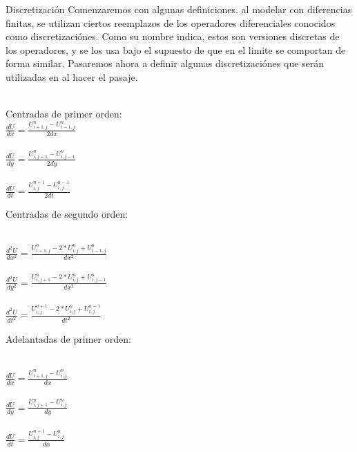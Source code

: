 
\begin{section}{Discretización}
Comenzaremos con algunas definiciones. al modelar con diferencias finitas, se utilizan ciertos reemplazos de los operadores diferenciales conocidos como discretizaciónes. Como su nombre indica, estos son versiones discretas de los operadores, y se los usa bajo el supuesto de que en el limite se comportan de forma similar. Pasaremos ahora a definir algunas discretizaciónes que serán utilizadas en al hacer el pasaje.
~\\
~\\
\begin{minipage}{\linewidth}

Centradas de primer orden:
~\\
$\frac{dU}{dx} = \frac{U^{n}_{i+1,j} - U^{n}_{i-1,j}}{2dx} $
~\\
~\\
$\frac{dU}{dy} = \frac{U^{n}_{i,j+1} - U^{n}_{i,j-1}}{2dy} $
~\\
~\\
$\frac{dU}{dt} = \frac{U^{n+1}_{i,j} - U^{n-1}_{i,j}}{2dt} $
~\\

\end{minipage}
\begin{minipage}{\linewidth}



Centradas de segundo orden:

~\\
$\frac{d^{2}U}{dx^{2}} = \frac{ U^{n}_{i+1,j} - 2*U^{n}_{i,j} + U^{n}_{i-1,j}}{dx^2}$
~\\
~\\
$\frac{d^{2}U}{dy^{2}} = \frac{ U^{n}_{i,j+1} - 2*U^{n}_{i,j} + U^{n}_{i,j-1}}{dx^2}$
~\\
~\\
$\frac{d^{2}U}{dt^{2}} = \frac{ U^{n+1}_{i,j} - 2*U^{n}_{i,j} + U^{n-1}_{i,j}}{dt^2}$
~\\

\end{minipage}
\begin{minipage}{\linewidth}

Adelantadas de primer orden:

~\\
$\frac{dU}{dx} = \frac{U^{n}_{i+1,j} - U^{n}_{i,j}}{dx} $
~\\
~\\
$\frac{dU}{dy} = \frac{U^{n}_{i,j+1} - U^{n}_{i,j}}{dy} $
~\\
~\\
$\frac{dU}{dt} = \frac{U^{n+1}_{i,j} - U^{n}_{i,j}}{dx} $
~\\


\end{minipage}
\end{section}
